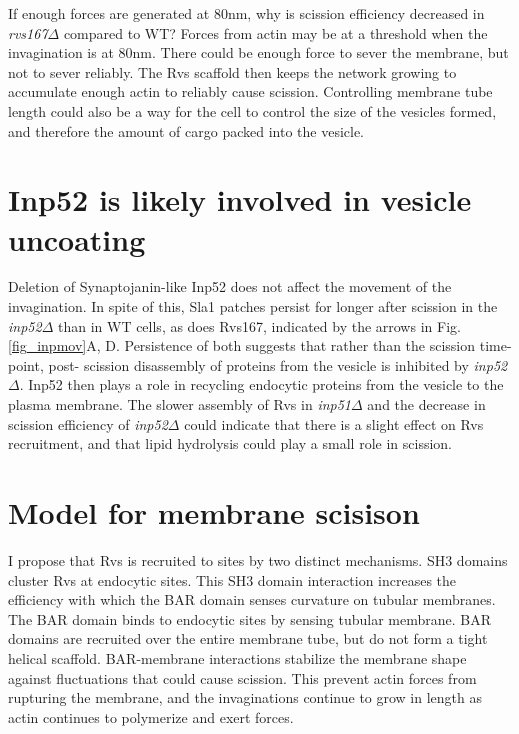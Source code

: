 	\vspace{5mm}
If enough forces are generated at 80nm, why is scission efficiency decreased in \textit{rvs167$\Delta$} compared to WT? 
Forces from actin may be at a threshold when the invagination is at 80nm. There could be enough force to sever the membrane, but not to sever reliably. The Rvs scaffold then keeps the network growing to accumulate enough actin to reliably cause scission. Controlling membrane tube length could also be a way for the cell to control the size of the vesicles formed, and therefore the amount of cargo packed into the vesicle. 





\section{Inp52 is likely involved in vesicle uncoating}
Deletion of Synaptojanin-like Inp52 does not affect the movement of the invagination. In spite of this, Sla1 patches persist for longer after scission in the \textit{inp52$\Delta$} than in WT cells, as does Rvs167, indicated by the arrows in Fig.\ref{fig_inpmov}A, D. Persistence of both suggests that rather than the scission time-point, post- scission disassembly of proteins from the vesicle is inhibited by \textit{inp52$\Delta$}. Inp52 then plays a role in recycling endocytic proteins from the vesicle to the plasma membrane. The slower assembly of Rvs in \textit{inp51$\Delta$}  and the decrease in scission efficiency of \textit{inp52$\Delta$} could indicate that there is a slight effect on Rvs recruitment, and that lipid hydrolysis could play a small role in scission. 


\newpage
\section{Model for membrane scisison}
I propose that Rvs is recruited to sites by two distinct mechanisms. SH3 domains cluster Rvs at endocytic sites. This SH3 domain interaction increases the efficiency with which the BAR domain senses curvature on tubular membranes. The BAR domain binds to endocytic sites by sensing tubular membrane. BAR domains are recruited over the entire membrane tube, but do not form a tight helical scaffold. BAR-membrane interactions stabilize the membrane shape against fluctuations that could cause scission. This prevent actin forces from rupturing the membrane, and the invaginations continue to grow in length as actin continues to polymerize and exert forces. 


